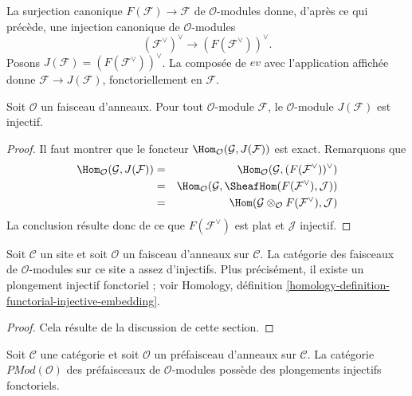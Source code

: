 \noindent
La surjection canonique $F(\mathcal{F}) \to \mathcal{F}$ de
$\mathcal{O}$-modules donne, d'après ce qui précède, une injection canonique de
$\mathcal{O}$-modules
$$
(\mathcal{F}^\vee)^\vee \longrightarrow (F(\mathcal{F}^\vee))^\vee.
$$
Posons $J(\mathcal{F}) = (F(\mathcal{F}^\vee))^\vee$. La composée de $ev$
avec l'application affichée donne
$\mathcal{F} \to J(\mathcal{F})$, fonctoriellement en $\mathcal{F}$.

\begin{lemma}
\label{lemma-JM-injective-sheaves}
Soit $\mathcal{O}$ un faisceau d'anneaux. Pour tout $\mathcal{O}$-module
$\mathcal{F}$, le $\mathcal{O}$-module $J(\mathcal{F})$ est injectif.
\end{lemma}

\begin{proof}
Il faut montrer que le foncteur
$\Hom_\mathcal{O}(\mathcal{G}, J(\mathcal{F}))$ est exact. Remarquons que
\begin{eqnarray*}
\Hom_\mathcal{O}(\mathcal{G}, J(\mathcal{F}))
& = &
\Hom_\mathcal{O}(\mathcal{G}, (F(\mathcal{F}^\vee))^\vee) \\
& = &
\Hom_\mathcal{O}
(\mathcal{G}, \SheafHom(F(\mathcal{F}^\vee), \mathcal{J})) \\
& = &
\Hom(\mathcal{G} \otimes_\mathcal{O} F(\mathcal{F}^\vee), \mathcal{J})
\end{eqnarray*}
La conclusion résulte donc de ce que $F(\mathcal{F}^\vee)$ est plat et
$\mathcal{J}$ injectif.
\end{proof}

\begin{theorem}
\label{theorem-sheaves-modules-injectives}
Soit $\mathcal{C}$ un site et soit $\mathcal{O}$ un faisceau d'anneaux sur
$\mathcal{C}$. La catégorie des faisceaux de $\mathcal{O}$-modules sur ce site
a assez d'injectifs. Plus précisément, il existe un plongement injectif
fonctoriel ; voir Homology, définition
\ref{homology-definition-functorial-injective-embedding}.
\end{theorem}

\begin{proof}
Cela résulte de la discussion de cette section.
\end{proof}

\begin{proposition}
\label{proposition-presheaves-modules}
Soit $\mathcal{C}$ une catégorie et soit $\mathcal{O}$ un préfaisceau
d'anneaux sur $\mathcal{C}$. La catégorie
$\textit{PMod}(\mathcal{O})$ des préfaisceaux de $\mathcal{O}$-modules possède
des plongements injectifs fonctoriels.
\end{proposition}

